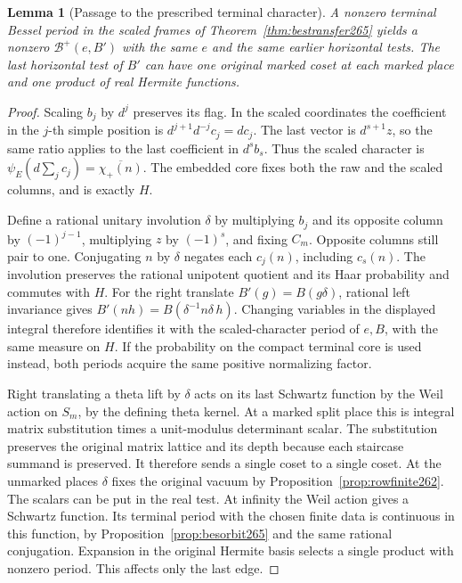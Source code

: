 \documentclass[a4paper,11pt]{article}
\newtheorem{lemma}[proposition]{Lemma}
\theoremstyle{definition}
\theoremstyle{remark}
\numberwithin{equation}{section}
\begin{document}
\begin{lemma}[Passage to the prescribed terminal character]\leavevmode
\label{lem:topchar266}
A nonzero terminal Bessel period in the scaled frames of
Theorem~\ref{thm:bestransfer265} yields a nonzero
\(\mathcal B^+(e,B')\) with the same \(e\) and the same
earlier horizontal tests. The last horizontal test of \(B'\)
can have one original marked coset at each marked place and
one product of real Hermite functions.
\end{lemma}
\begin{proof}
Scaling \(b_j\) by \(d^j\) preserves its flag. In the scaled
coordinates the coefficient in the \(j\)-th simple position
is \(d^{j+1}d^{-j}c_j=dc_j\). The last vector is \(d^{s+1}z\),
so the same ratio applies to the last coefficient in \(d^sb_s\).
Thus the scaled character is
\(\psi_E(d\sum_jc_j)=\overline{\chi_+(n)}\).
The embedded core fixes both the raw and the scaled columns,
and is exactly \(H\).

Define a rational unitary involution \(\delta\) by multiplying
\(b_j\) and its opposite column by \((-1)^{j-1}\), multiplying
\(z\) by \((-1)^s\), and fixing \(C_m\). Opposite columns
still pair to one. Conjugating \(n\) by \(\delta\) negates
each \(c_j(n)\), including \(c_s(n)\). The involution preserves
the rational unipotent quotient and its Haar probability and
commutes with \(H\). For the right translate
\(B'(g)=B(g\delta)\), rational left invariance gives
\(B'(nh)=B(\delta^{-1}n\delta\,h)\). Changing variables in
the displayed integral therefore identifies it with the
scaled-character period of \(e,B\), with the same measure
on \(H\). If the probability on the compact terminal core
is used instead, both periods acquire the same positive
normalizing factor.

Right translating a theta lift by \(\delta\) acts on its last
Schwartz function by the Weil action on \(S_m\), by the defining
theta kernel. At a marked split place this is integral matrix
substitution times a unit-modulus determinant scalar. The
substitution preserves the original matrix lattice and its
depth because each staircase summand is preserved. It therefore
sends a single coset to a single coset. At the unmarked places
\(\delta\) fixes the original vacuum by
Proposition~\ref{prop:rowfinite262}. The scalars can be put
in the real test. At infinity the Weil action gives a Schwartz
function. Its terminal period with the chosen finite data is
continuous in this function, by
Proposition~\ref{prop:besorbit265} and the same rational
conjugation. Expansion in the original Hermite basis selects
a single product with nonzero period. This affects only the
last edge.
\end{proof}
\end{document}
